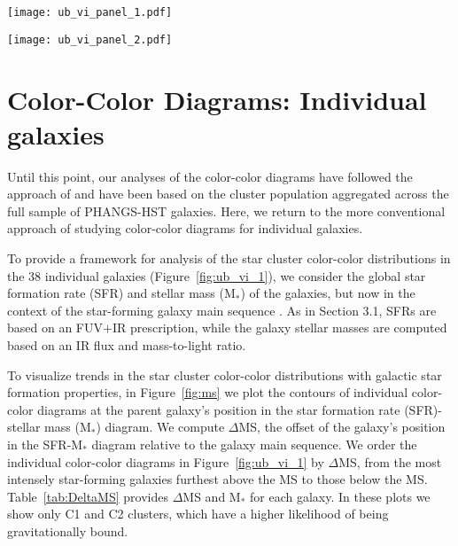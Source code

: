 \documentclass[linenumbers]{aastex63}
\begin{document}
\begin{figure*}[h]
\texttt{[image: ub\_vi\_panel\_1.pdf]}
 \caption{UB-VI color-color diagrams for each individual PHANGS-HST galaxies. We present ML classified class 1 and 2 clusters with black contours. With green and blue points, we over-plot human classified class 1 and 2 clusters, respectively. For reference, we show the solar metallicity track with a red line of the -model. To indicate the direction of color-color shift due to reddening, we show a black arrow in the top left which indicates a reddening of ${\rm A_{V} = 1}$. To study the color-color distribution of each galaxy with respect to the position of the Main Sequence (MS) of star-forming galaxies (see Figure~\ref{fig:ms}), we sort the diagrams in decreasing order of $\Delta$MS values.}
 \label{fig:ub_vi_1}
\end{figure*}
\begin{figure*}[h]
\texttt{[image: ub\_vi\_panel\_2.pdf]}
\end{figure*}

\section{Color-Color Diagrams: Individual galaxies}\label{ssect:cc_sf}


Until this point, our analyses of the color-color diagrams have followed the approach of \citet{lee23ubvi} and have been based on the cluster population aggregated across the full sample of PHANGS-HST galaxies.  Here, we return to the more conventional approach of studying color-color diagrams for individual galaxies.

To provide a framework for analysis of the star cluster color-color distributions in the 38 individual galaxies (Figure~\ref{fig:ub_vi_1}), we consider the global star formation rate (SFR) and stellar mass (M$_*$) of the galaxies, but now in the context of the star-forming galaxy main sequence \citep[e.g.,][]{salim_uv_2007, noeske_star_2007, lee_star_2007,peng_mass_2010}.  As in Section 3.1, SFRs are based on an FUV$+$IR prescription, while the galaxy stellar masses are computed based on an IR flux and mass-to-light ratio.

To visualize trends in the star cluster color-color distributions with galactic star formation properties, in  Figure~\ref{fig:ms} we plot the contours of individual color-color diagrams at the parent galaxy’s position in the star formation rate (SFR)-stellar mass (M$_*$) diagram.  We compute $\Delta$MS, the offset of the galaxy's position in the SFR-M$_*$ diagram relative to the galaxy main sequence.   We order the individual color-color diagrams in Figure~\ref{fig:ub_vi_1} by $\Delta$MS, from the most intensely star-forming galaxies furthest above the MS to those below the MS.  Table~\ref{tab:DeltaMS} provides $\Delta$MS and M$_*$ for each galaxy.  In these plots we show only C1 and C2 clusters, which have a higher likelihood of being gravitationally bound.  
\end{document}
